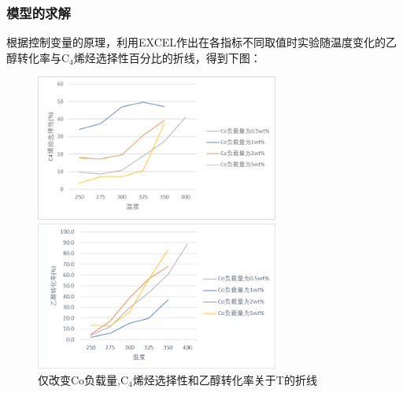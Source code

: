 \documentclass[a4paper,10.5pt]{ctexart}
\begin{document}
\subsubsection{模型的求解}
\par 根据控制变量的原理，利用EXCEL作出在各指标不同取值时实验随温度变化的乙醇转化率与C$_4$烯烃选择性百分比的折线，得到下图：

\begin{figure}[h]
\centering
\begin{minipage}[t]{0.48\textwidth}
\centering
\includegraphics[width=8cm]{200200与1.68Co负载量C4.png}
\end{minipage}
\begin{minipage}[t]{0.48\textwidth}
\centering
\includegraphics[width=8cm]{200200与1.68Co负载量乙醇.png}
\end{minipage}
\caption{\centering 仅改变Co负载量,C$_4$烯烃选择性和乙醇转化率关于T的折线}
\end{figure}
\end{document}
